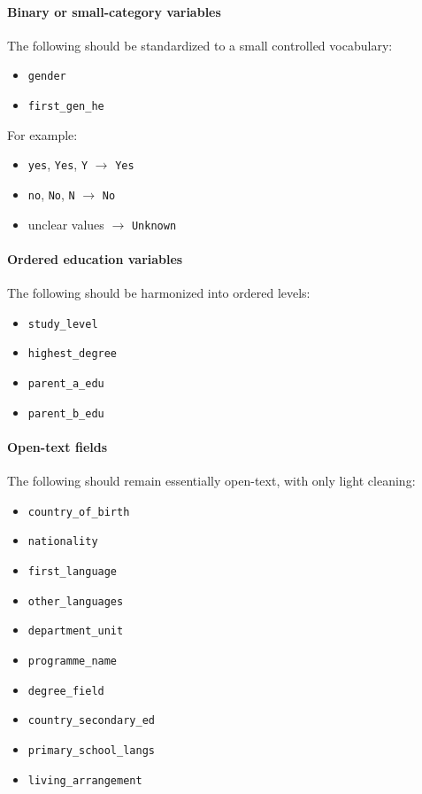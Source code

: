 \paragraph{Binary or small-category variables}
The following should be standardized to a small controlled vocabulary:
\begin{itemize}
    \item \texttt{gender}
    \item \texttt{first\_gen\_he}
\end{itemize}

For example:
\begin{itemize}
    \item \texttt{yes}, \texttt{Yes}, \texttt{Y} $\rightarrow$ \texttt{Yes}
    \item \texttt{no}, \texttt{No}, \texttt{N} $\rightarrow$ \texttt{No}
    \item unclear values $\rightarrow$ \texttt{Unknown}
\end{itemize}

\paragraph{Ordered education variables}
The following should be harmonized into ordered levels:
\begin{itemize}
    \item \texttt{study\_level}
    \item \texttt{highest\_degree}
    \item \texttt{parent\_a\_edu}
    \item \texttt{parent\_b\_edu}
\end{itemize}

\paragraph{Open-text fields}
The following should remain essentially open-text, with only light cleaning:
\begin{itemize}
    \item \texttt{country\_of\_birth}
    \item \texttt{nationality}
    \item \texttt{first\_language}
    \item \texttt{other\_languages}
    \item \texttt{department\_unit}
    \item \texttt{programme\_name}
    \item \texttt{degree\_field}
    \item \texttt{country\_secondary\_ed}
    \item \texttt{primary\_school\_langs}
    \item \texttt{living\_arrangement}
\end{itemize}

